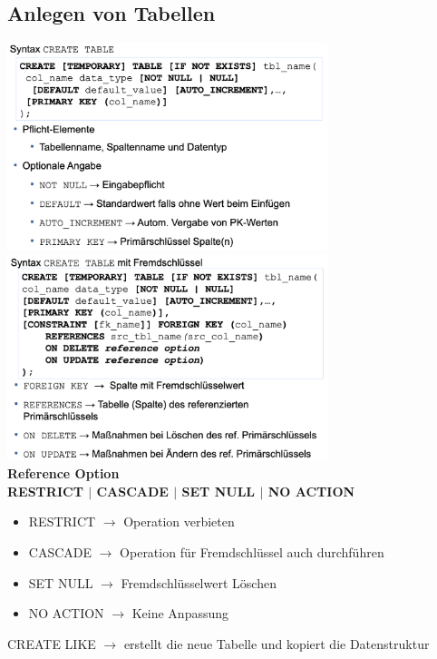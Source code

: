 \documentclass{scrreprt}
\newcommand\tab[1][1cm]{\hspace*{#1}}
\begin{document}
\subsection{Anlegen von Tabellen}
\includegraphics[width=0.7\textwidth]{"graphics/anlage-tabelle"}
\\\includegraphics[width=0.7\textwidth]{"graphics/tabelle-fk"}
\\\textbf{Reference Option}
\\\tab \textbf{RESTRICT $|$ CASCADE $|$ SET NULL $|$ NO ACTION}
\\\begin{itemize}
  \item RESTRICT $\rightarrow$ Operation verbieten
  \item CASCADE $\rightarrow$ Operation für Fremdschlüssel auch durchführen
  \item SET NULL $\rightarrow$ Fremdschlüsselwert Löschen
  \item NO ACTION $\rightarrow$ Keine Anpassung
\end{itemize}
CREATE LIKE $\rightarrow$ erstellt die neue Tabelle und kopiert die Datenstruktur
\end{document}
